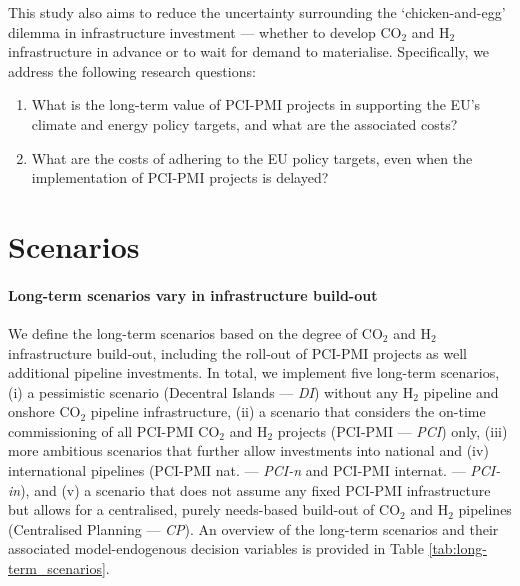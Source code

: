 \documentclass[pdflatex,sn-nature]{sn-jnl}%
\theoremstyle{thmstyleone}%
\theoremstyle{thmstyletwo}%
\theoremstyle{thmstylethree}%
\begin{document}
This study also aims to reduce the uncertainty surrounding the `chicken-and-egg' dilemma in infrastructure investment --- whether to develop CO$_2$ and H$_2$ infrastructure in advance or to wait for demand to materialise. Specifically, we address the following research questions: 
\begin{enumerate} 
  \item What is the long-term value of PCI-PMI projects in supporting the EU’s climate and energy policy targets, and what are the associated costs?
  \item What are the costs of adhering to the EU policy targets, even when the implementation of PCI-PMI projects is delayed?
\end{enumerate}

\section*{Scenarios}\label{sec:scenarios}
\paragraph{Long-term scenarios vary in infrastructure build-out}
We define the long-term scenarios based on the degree of CO$_2$ and H$_2$ infrastructure build-out, including the roll-out of PCI-PMI projects as well additional pipeline investments. In total, we implement five long-term scenarios, (i) a pessimistic scenario (Decentral Islands --- \textit{DI}) without any H$_2$ pipeline and onshore CO$_2$ pipeline infrastructure, (ii) a scenario that considers the on-time commissioning of all PCI-PMI CO$_2$ and H$_2$ projects (PCI-PMI --- \textit{PCI}) only, (iii) more ambitious scenarios that further allow investments into national and (iv) international pipelines (PCI-PMI nat. --- \textit{PCI-n} and PCI-PMI internat. --- \textit{PCI-in}), and (v) a scenario that does not assume any fixed PCI-PMI infrastructure but allows for a centralised, purely needs-based build-out of CO$_2$ and H$_2$ pipelines (Centralised Planning --- \textit{CP}). An overview of the long-term scenarios and their associated model-endogenous decision variables is provided in Table \ref{tab:long-term_scenarios}. 
\end{document}
